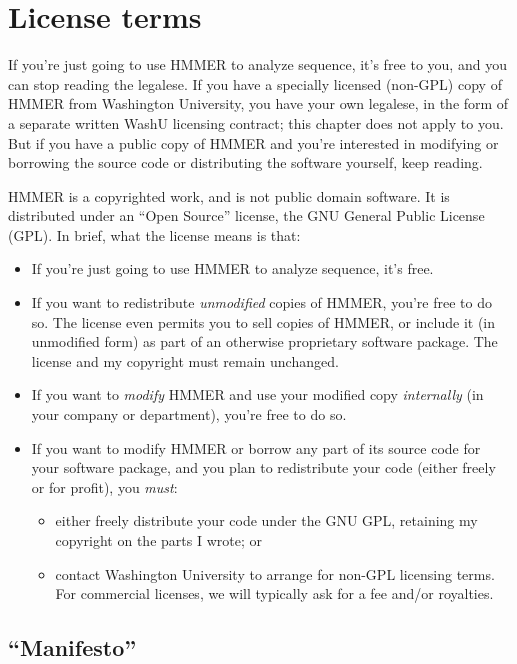 \chapter{License terms}

If you're just going to use HMMER to analyze sequence, it's free to
you, and you can stop reading the legalese. If you have a specially
licensed (non-GPL) copy of HMMER from Washington University, you have
your own legalese, in the form of a separate written WashU licensing
contract; this chapter does not apply to you. But if you have a public
copy of HMMER and you're interested in modifying or borrowing the
source code or distributing the software yourself, keep reading.

HMMER is a copyrighted work, and is not public domain software.  It is
distributed under an ``Open Source'' license, the GNU General Public
License (GPL). In brief, what the license means is that:

\begin{itemize}
\item If you're just going to use HMMER to analyze sequence, it's free.

\item If you want to redistribute {\em unmodified} copies of
HMMER, you're free to do so.  The license even permits you to sell
copies of HMMER, or include it (in unmodified form) as part of an
otherwise proprietary software package. The license and my copyright
must remain unchanged.

\item If you want to {\em modify} HMMER and use your modified
copy {\em internally} (in your company or department), you're free to
do so.

\item If you want to modify HMMER or borrow any part of its source code
for your software package, and you plan to redistribute your code
(either freely or for profit), you {\em must}:
\begin{itemize}
\item either freely distribute your code under the GNU GPL, retaining
my copyright on the parts I wrote; or
\item contact Washington University to arrange for non-GPL licensing
terms.  For commercial licenses, we will typically ask for a fee
and/or royalties.
\end{itemize}
\end{itemize}

\section{``Manifesto''}

